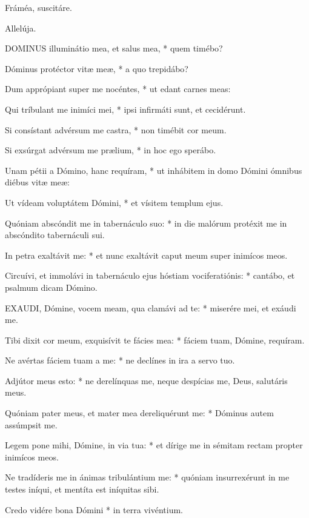 
 Fráméa, suscitáre.

  Allelúja.


\lettrine[lines=2]{D}{OMINUS} illuminátio mea, et salus mea, * quem timébo?

Dóminus protéctor vitæ meæ, * a quo trepidábo?

Dum apprópiant super me nocéntes, * ut edant carnes meas:

Qui tríbulant me inimíci mei, * ipsi infirmáti sunt, et cecidérunt.

Si consístant advérsum me castra, * non timébit cor meum.

Si exsúrgat advérsum me prælium, * in hoc ego sperábo.

Unam pétii a Dómino, hanc requíram, * ut inhábitem in domo Dómini ómnibus diébus vitæ meæ:

Ut vídeam voluptátem Dómini, * et vísitem templum ejus.

Quóniam abscóndit me in tabernáculo suo: * in die malórum protéxit me in abscóndito tabernáculi sui.

In petra exaltávit me: * et nunc exaltávit caput meum super inimícos meos.

Circuívi, et immolávi in tabernáculo ejus hóstiam vociferatiónis: * cantábo, et psalmum dicam Dómino.


\lettrine[lines=2]{E}{XAUDI}, Dómine, vocem meam, qua clamávi ad te: * miserére mei, et exáudi me.

Tibi dixit cor meum, exquisívit te fácies mea: * fáciem tuam, Dómine, requíram.

Ne avértas fáciem tuam a me: * ne declínes in ira a servo tuo.

Adjútor meus esto: * ne derelínquas me, neque despícias me, Deus, salutáris meus.

Quóniam pater meus, et mater mea dereliquérunt me: * Dóminus autem assúmpsit me.

Legem pone mihi, Dómine, in via tua: * et dírige me in sémitam rectam propter inimícos meos.

Ne tradíderis me in ánimas tribulántium me: * quóniam insurrexérunt in me testes iníqui, et mentíta est iníquitas sibi.

Credo vidére bona Dómini * in terra vivéntium.

